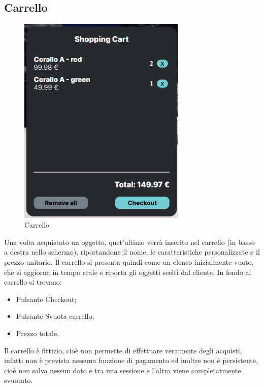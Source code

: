 \subsection{Carrello}
\begin{figure}[H]
  \renewcommand{\thefigure}{6}
\begin{center}
  \includegraphics[width=8cm]{./res/images/carrello.png}
\end{center}
  \caption{Carrello}
  \label{Carrello}
\end{figure}

Una volta acquistato un oggetto, quet'ultimo verrà inserito nel carrello (in basso a destra nello schermo), riportandone il nome, le caratteristiche personalizzate e il prezzo unitario.
Il carrello si presenta quindi come un elenco inizialmente vuoto, che si aggiorna in tempo reale e riporta gli oggetti scelti dal cliente.
In fondo al carrello si trovano:
\begin{itemize}
	\item Pulsante Checkout;
	\item Pulsante Svuota carrello;
	\item Prezzo totale.
\end{itemize}
Il carrello è fittizio, cioè non permette di effettuare veramente degli acquisti, infatti non è prevista nessuna funzione di pagamento ed inoltre non è persistente, cioè non salva nessun dato e tra una sessione e l'altra viene completatmente svuotato.
\pagebreak

